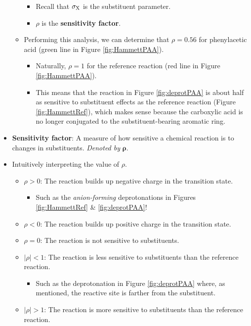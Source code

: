 \documentclass[../notes.tex]{subfiles}
\begin{document}
\begin{itemize}
\begin{itemize}
\begin{itemize}
            \item Recall that $\sigma_{\ce{X}}$ is the substituent parameter.
            \item $\rho$ is the \textbf{sensitivity factor}.
        \end{itemize}
        \item Performing this analysis, we can determine that $\rho=0.56$ for phenylacetic acid (green line in Figure \ref{fig:HammettPAA}).
        \begin{itemize}
            \item Naturally, $\rho=1$ for the reference reaction (red line in Figure \ref{fig:HammettPAA}).
            \item This means that the reaction in Figure \ref{fig:deprotPAA} is about half as sensitive to substituent effects as the reference reaction (Figure \ref{fig:HammettRef}), which makes sense because the carboxylic acid is no longer conjugated to the substituent-bearing aromatic ring.
        \end{itemize}
    \end{itemize}
    \item \textbf{Sensitivity factor}: A measure of how sensitive a chemical reaction is to changes in substituents. \emph{Denoted by} $\bm{\rho}$.
    \item Intuitively interpreting the value of $\rho$.
    \begin{itemize}
        \item $\rho>0$: The reaction builds up negative charge in the transition state.
        \begin{itemize}
            \item Such as the \emph{anion-forming} deprotonations in Figures \ref{fig:HammettRef} \& \ref{fig:deprotPAA}!
        \end{itemize}
        \item $\rho<0$: The reaction builds up positive charge in the transition state.
        \item $\rho=0$: The reaction is not sensitive to substituents.
        \item $|\rho|<1$: The reaction is less sensitive to substituents than the reference reaction.
        \begin{itemize}
            \item Such as the deprotonation in Figure \ref{fig:deprotPAA} where, as mentioned, the reactive site is farther from the substituent.
        \end{itemize}
        \item $|\rho|>1$: The reaction is more sensitive to substituents than the reference reaction.

\end{itemize}
\end{itemize}
\end{document}

